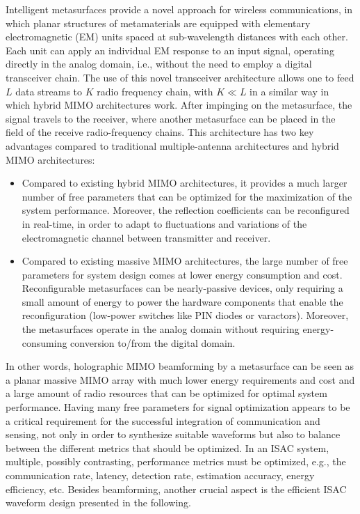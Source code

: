 \documentclass[journal, comsoc]{IEEEtran}
\begin{document}
Intelligent metasurfaces provide a novel approach for wireless communications, in which planar structures of metamaterials are equipped with elementary electromagnetic (EM) units spaced at sub-wavelength distances with each other. Each unit can apply an individual EM response to an input signal, operating directly in the analog domain, i.e., without the need to employ a digital transceiver chain.  The use of this novel transceiver architecture allows one to feed $L$ data streams to $K$ radio frequency chain, with $K\ll L$ in a similar way in which hybrid MIMO architectures work. After impinging on the metasurface, the signal travels to the receiver, where another metasurface can be placed in the field of the receive radio-frequency chains. This architecture has two key advantages compared to traditional multiple-antenna architectures and hybrid MIMO architectures:
\begin{itemize}
\item Compared to existing hybrid MIMO architectures, it provides a much larger number of free parameters that can be optimized for the maximization of the system performance. Moreover, the reflection coefficients can be reconfigured in real-time, in order to adapt to fluctuations and variations of the electromagnetic channel between transmitter and receiver. 
\item Compared to existing massive MIMO architectures, the large number of free parameters for system design comes at lower energy consumption and cost. Reconfigurable metasurfaces can be nearly-passive devices, only requiring a small amount of energy to power the hardware components that enable the reconfiguration (low-power switches like PIN diodes or varactors). Moreover, the metasurfaces operate in the analog domain without requiring energy-consuming conversion to/from the digital domain. 
\end{itemize}

In other words, holographic MIMO beamforming by a metasurface can be seen as a planar massive MIMO array with much lower energy requirements and cost and a large amount of radio resources that can be optimized for optimal system performance. Having many free parameters for signal optimization appears to be a critical requirement for the successful integration of communication and sensing, not only in order to synthesize suitable waveforms but also to balance between the different metrics that should be optimized. In an ISAC system, multiple, possibly contrasting, performance metrics must be optimized, e.g., the communication rate, latency, detection rate, estimation accuracy, energy efficiency, etc. Besides beamforming, another crucial aspect is the efficient ISAC waveform design presented in the following. 
\end{document}
